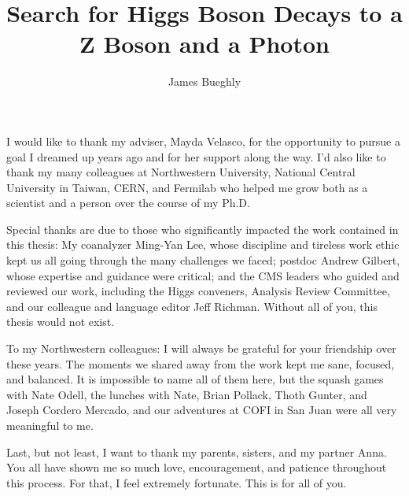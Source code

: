 \documentclass[12pt]{template/nuthesis}
\author{James Bueghly}
\title{Search for Higgs Boson Decays to a Z Boson and a Photon}
\begin{document}
%	
%


\frontmatter		%

\maketitle		%

\copyrightpage		%




\acknowledgements	%

I would like to thank my adviser, Mayda Velasco, for the opportunity to pursue a goal I dreamed up years ago and for her support along the way. I'd also like to thank my many colleagues at Northwestern University, National Central University in Taiwan, CERN, and Fermilab who helped me grow both as a scientist and a person over the course of my Ph.D. 

Special thanks are due to those who significantly impacted the work contained in this thesis: My coanalyzer Ming-Yan Lee, whose discipline and tireless work ethic kept us all going through the many challenges we faced; postdoc Andrew Gilbert, whose expertise and guidance were critical; and the CMS leaders who guided and reviewed our work, including the Higgs conveners, Analysis Review Committee, and our colleague and language editor Jeff Richman. Without all of you, this thesis would not exist.

To my Northwestern colleagues: I will always be grateful for your friendship over these years. The moments we shared away from the work kept me sane, focused, and balanced. It is impossible to name all of them here, but the squash games with Nate Odell, the lunches with Nate, Brian Pollack, Thoth Gunter, and Joseph Cordero Mercado, and our adventures at COFI in San Juan were all very meaningful to me. 

Last, but not least, I want to thank my parents, sisters, and my partner Anna. You all have shown me so much love, encouragement, and patience throughout this process. For that, I feel extremely fortunate. This is for all of you. 



%


%
%
%
%
%
%
%
%
\end{document}
